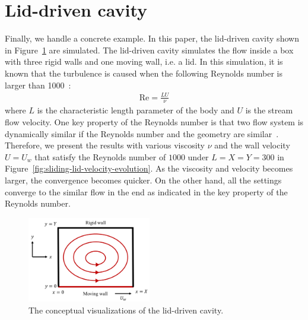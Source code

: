 \section{Lid-driven cavity}
Finally, we handle a concrete example.
In this paper, the lid-driven cavity shown in Figure~\ref{lid-driven-cavity-conceptual} are simulated.
The lid-driven cavity simulates the flow inside a box with
three rigid walls and one moving wall, i.e. a lid.
In this simulation, it is known that the turbulence is caused 
when the following Reynolds number is larger than 1000~\cite{chiang1998effect}:
\begin{equation}
\begin{aligned}
  \text{Re} = \frac{LU}{\nu}
\end{aligned}
\end{equation}
where $L$ is the characteristic length parameter
of the body and $U$ is the stream flow velocity.
One key property of the Reynolds number is that two flow system
is dynamically similar if the Reynolds number and the geometry are similar~\cite{kundu2008fluid}.
Therefore, we present the results with various 
viscosity $\nu$ and the wall velocity $U = U_w$ that 
satisfy the Reynolds number of $1000$ under $L = X = Y = 300$
in Figure~\ref{fig:sliding-lid-velocity-evolution}.
As the viscosity and velocity becomes larger,
the convergence becomes quicker.
On the other hand, all the settings converge to the similar flow in the end
as indicated in the key property of the Reynolds number.

\begin{figure}[t]
  \centering
  \includegraphics[width=0.48\textwidth]{imgs/lid-driven-cavity.pdf}
  \caption{The conceptual visualizations of the lid-driven cavity.}
  \label{lid-driven-cavity-conceptual}
\end{figure}

